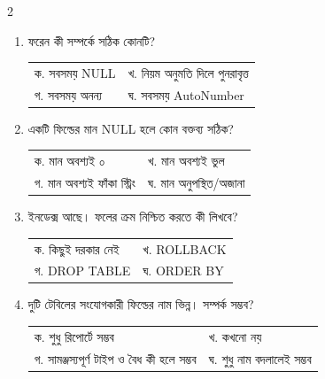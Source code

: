 \begin{multicols}{2}
\begin{enumerate}[resume]
\item \begin{minipage}[t]{\linewidth}
ফরেন কী সম্পর্কে সঠিক কোনটি?
\par
\begin{tabularx}{\linewidth}{@{}X X@{}}
ক. সবসময় NULL & খ. নিয়ম অনুমতি দিলে পুনরাবৃত্ত \\
গ. সবসময় অনন্য & ঘ. সবসময় AutoNumber \\
\end{tabularx}
\end{minipage}
\vspace{1pt}

\item \begin{minipage}[t]{\linewidth}
একটি ফিল্ডের মান NULL হলে কোন বক্তব্য সঠিক?
\par
\begin{tabularx}{\linewidth}{@{}X X@{}}
ক. মান অবশ্যই ০ & খ. মান অবশ্যই ভুল \\
গ. মান অবশ্যই ফাঁকা স্ট্রিং & ঘ. মান অনুপস্থিত/অজানা \\
\end{tabularx}
\end{minipage}
\vspace{1pt}

\item \begin{minipage}[t]{\linewidth}
ইনডেক্স আছে। ফলের ক্রম নিশ্চিত করতে কী লিখবে?
\par
\begin{tabularx}{\linewidth}{@{}X X@{}}
ক. কিছুই দরকার নেই & খ. ROLLBACK \\
গ. DROP TABLE & ঘ. ORDER BY \\
\end{tabularx}
\end{minipage}
\vspace{1pt}

\item \begin{minipage}[t]{\linewidth}
দুটি টেবিলের সংযোগকারী ফিল্ডের নাম ভিন্ন। সম্পর্ক সম্ভব?
\par
\begin{tabularx}{\linewidth}{@{}X X@{}}
ক. শুধু রিপোর্টে সম্ভব & খ. কখনো নয় \\
গ. সামঞ্জস্যপূর্ণ টাইপ ও বৈধ কী হলে সম্ভব & ঘ. শুধু নাম বদলালেই সম্ভব \\
\end{tabularx}
\end{minipage}
\vspace{1pt}


\end{enumerate}
\end{multicols}
